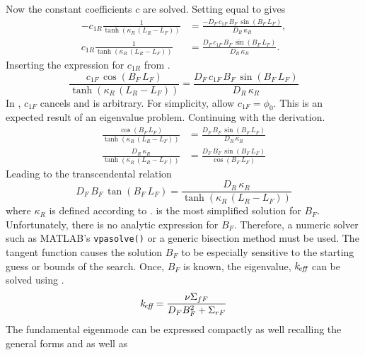   Now the constant coefficients $c$ are solved. Setting  
  equal to  gives
  \begin{align}
    -c_{1R} \frac{1}{\tanh(\kappa_R\,(L_R-L_F))}
      &= \frac{-D_F \, c_{1F} \, B_F \, \sin(B_F \, L_F)}{D_R\,\kappa_R}, \\
    c_{1R} \frac{1}{\tanh(\kappa_R\,(L_R-L_F))}
      &= \frac{D_F \, c_{1F} \, B_F \, \sin(B_F \, L_F)}{D_R\,\kappa_R}.
  \end{align}
  Inserting the expression for $c_{1R}$ from .
  \begin{equation}
    \label{eq:2reg_c1f_arbitrary}
    \frac{c_{1F} \, \cos(B_F \, L_F)}{\tanh(\kappa_R \, (L_R-L_F))} =
      \frac{D_F \, c_{1F} \, B_F \, \sin(B_F \, L_F)}{D_R \, \kappa_R}
  \end{equation}
  In , $c_{1F}$ cancels and is arbitrary. For
  simplicity, allow $c_{1F} = \phi_0$.
  This is an expected result of an eigenvalue problem. Continuing with the
  derivation.
  \begin{align}
    \frac{\cos(B_F \, L_F)}{\tanh(\kappa_R \, (L_R-L_F))} &=
      \frac{D_F \, B_F \, \sin(B_F \, L_F)}{D_R \, \kappa_R} \\
    \frac{D_R \, \kappa_R}{\tanh(\kappa_R \, (L_R - L_F))} &= 
      \frac{D_F \, B_F \, \sin(B_F \, L_F)}{\cos(B_F \, L_F)}
  \end{align}
  Leading to the transcendental relation
  \begin{equation}
    \label{eq:2reg_bf}
    D_F \, B_F \, \tan(B_F \, L_F) = 
      \frac{D_R \, \kappa_R}{\tanh(\kappa_R \, (L_R-L_F))}
  \end{equation}
  where $\kappa_R$ is defined according to . 
   is the most simplified solution for $B_F$. Unfortunately,
  there is no analytic expression for $B_F$. Therefore, a numeric solver 
  such as MATLAB's \verb|vpasolve()| or a generic bisection method must be used.
  The tangent function causes the solution $B_F$ to be especially sensitive to 
  the starting guess or bounds of the search. Once, $B_F$ is known, the 
  eigenvalue, $k_{\!\mbox{\scriptsize \em eff}}$ can be solved using .
  \begin{equation}
    \label{eq:keff2reg}
    k_{\!\mbox{\scriptsize \em eff}} = \frac{\nu \Sigma_{fF}}{D_F B_F^2 + \Sigma_{rF}}
  \end{equation}
  The fundamental eigenmode can be expressed compactly as well recalling the
  general forms  and  as well as
